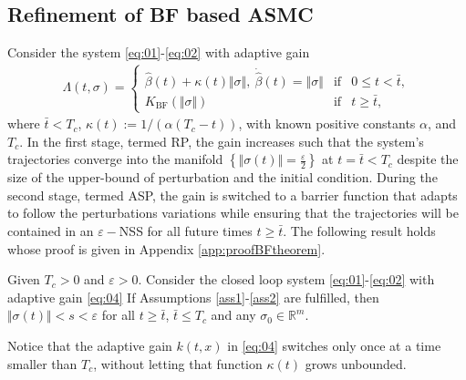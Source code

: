\documentclass[twocolumn]{autart}    %
\begin{document}
\subsection{Refinement of BF based ASMC}
\vspace{-3mm}
Consider the system \eqref{eq:01}-\eqref{eq:02} with adaptive gain
\begin{equation}\label{eq:04} 
\begin{aligned}
\Lambda(t,\sigma)=  \left \{ \begin{matrix} \hat{\beta}(t)+ \kappa(t)\Vert \sigma \Vert,\: \dot{\hat{\beta}}(t)=\Vert \sigma \Vert & \mathrm{if} & 0\leq t < \bar{t}, \\
K_{\mathrm{BF}}(\Vert \sigma \Vert) & \mathrm{if} & t \geq \bar{t},
\end{matrix}\right.
\end{aligned} 
\end{equation} where $\bar{t}< T_c$, $\kappa(t):=1/( \alpha(T_c-t))$, with known positive constants $\alpha$,  and $T_c$.  In the first stage, termed RP, the gain increases such that the system's trajectories converge into the manifold $\left\lbrace \Vert \sigma(t)\Vert = \frac{\varepsilon}{2} \right\rbrace$ at $t=\bar{t}<T_c$ despite the size of the upper-bound of perturbation and the initial condition.  During the second stage, termed ASP, the gain is switched to a barrier function that adapts to follow the perturbations variations while ensuring that the trajectories will be contained in an $\varepsilon-$NSS for all future times $t\geq \bar{t}$.  The following result holds whose proof is given in Appendix \ref{app:proofBFtheorem}.
\begin{thm}\label{thm:main}
Given $T_c>0$ and $\varepsilon>0$.  Consider the closed loop system \eqref{eq:01}-\eqref{eq:02} with adaptive gain \eqref{eq:04} If Assumptions \ref{ass1}-\ref{ass2} are fulfilled, then $\Vert \sigma(t) \Vert < s<\varepsilon$ for all $t\geq \bar
{t}$, $\bar{t}\leq T_c$ and any $\sigma_0\in \mathbb{R}^m$.
\end{thm}
\begin{rem}
Notice that the adaptive gain $k(t,x)$ in \eqref{eq:04} switches only once at a time smaller than $T_c$,  without letting that function $\kappa(t)$ grows unbounded. 
\end{rem}
\end{document}
